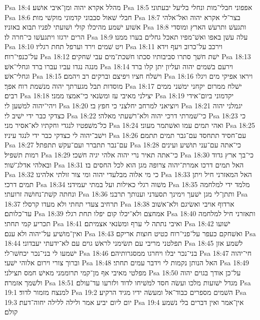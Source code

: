 Psa 18:4  מהלל אקרא יהוה ומן־איבי אושׁע׃
Psa 18:5  אפפוני חבלי־מות ונחלי בליעל יבעתוני׃
Psa 18:6  חבלי שׁאול סבבוני קדמוני מוקשׁי מות׃
Psa 18:7  בצר־לי אקרא יהוה ואל־אלהי אשׁוע ישׁמע מהיכלו קולי ושׁועתי לפניו תבוא באזניו׃
Psa 18:8  ותגעשׁ ותרעשׁ הארץ ומוסדי הרים ירגזו ויתגעשׁו כי־חרה לו׃
Psa 18:9  עלה עשׁן באפו ואשׁ־מפיו תאכל גחלים בערו ממנו׃
Psa 18:10  ויט שׁמים וירד וערפל תחת רגליו׃
Psa 18:11  וירכב על־כרוב ויעף וידא על־כנפי־רוח׃
Psa 18:12  ישׁת חשׁך סתרו סביבותיו סכתו חשׁכת־מים עבי שׁחקים׃
Psa 18:13  מנגה נגדו עביו עברו ברד וגחלי־אשׁ׃
Psa 18:14  וירעם בשׁמים יהוה ועליון יתן קלו ברד וגחלי־אשׁ׃
Psa 18:15  וישׁלח חציו ויפיצם וברקים רב ויהמם׃
Psa 18:16  ויראו אפיקי מים ויגלו מוסדות תבל מגערתך יהוה מנשׁמת רוח אפך׃
Psa 18:17  ישׁלח ממרום יקחני ימשׁני ממים רבים׃
Psa 18:18  יצילני מאיבי עז ומשׂנאי כי־אמצו ממני׃
Psa 18:19  יקדמוני ביום־אידי ויהי־יהוה למשׁען לי׃
Psa 18:20  ויוציאני למרחב יחלצני כי חפץ בי׃
Psa 18:21  יגמלני יהוה כצדקי כבר ידי ישׁיב לי׃
Psa 18:22  כי־שׁמרתי דרכי יהוה ולא־רשׁעתי מאלהי׃
Psa 18:23  כי כל־משׁפטיו לנגדי וחקתיו לא־אסיר מני׃
Psa 18:24  ואהי תמים עמו ואשׁתמר מעוני׃
Psa 18:25  וישׁב־יהוה לי כצדקי כבר ידי לנגד עיניו׃
Psa 18:26  עם־חסיד תתחסד עם־גבר תמים תתמם׃
Psa 18:27  עם־נבר תתברר ועם־עקשׁ תתפתל׃
Psa 18:28  כי־אתה עם־עני תושׁיע ועינים רמות תשׁפיל׃
Psa 18:29  כי־אתה תאיר נרי יהוה אלהי יגיה חשׁכי׃
Psa 18:30  כי־בך ארץ גדוד ובאלהי אדלג־שׁור׃
Psa 18:31  האל תמים דרכו אמרת־יהוה צרופה מגן הוא לכל החסים בו׃
Psa 18:32  כי מי אלוה מבלעדי יהוה ומי צור זולתי אלהינו׃
Psa 18:33  האל המאזרני חיל ויתן תמים דרכי׃
Psa 18:34  משׁוה רגלי כאילות ועל במתי יעמידני׃
Psa 18:35  מלמד ידי למלחמה ונחתה קשׁת־נחושׁה זרועתי׃
Psa 18:36  ותתן־לי מגן ישׁעך וימינך תסעדני וענותך תרבני׃
Psa 18:37  תרחיב צעדי תחתי ולא מעדו קרסלי׃
Psa 18:38  ארדוף אויבי ואשׂיגם ולא־אשׁוב עד־כלותם׃
Psa 18:39  אמחצם ולא־יכלו קום יפלו תחת רגלי׃
Psa 18:40  ותאזרני חיל למלחמה תכריע קמי תחתי׃
Psa 18:41  ואיבי נתתה לי ערף ומשׂנאי אצמיתם׃
Psa 18:42  ישׁועו ואין־מושׁיע על־יהוה ולא ענם׃
Psa 18:43  ואשׁחקם כעפר על־פני־רוח כטיט חוצות אריקם׃
Psa 18:44  תפלטני מריבי עם תשׂימני לראשׁ גוים עם לא־ידעתי יעבדוני׃
Psa 18:45  לשׁמע אזן ישׁמעו לי בני־נכר יכחשׁו־לי׃
Psa 18:46  בני־נכר יבלו ויחרגו ממסגרותיהם׃
Psa 18:47  חי־יהוה וברוך צורי וירום אלוהי ישׁעי׃
Psa 18:48  האל הנותן נקמות לי וידבר עמים תחתי׃
Psa 18:49  מפלטי מאיבי אף מן־קמי תרוממני מאישׁ חמס תצילני׃
Psa 18:50  על־כן אודך בגוים יהוה ולשׁמך אזמרה׃
Psa 18:51  מגדל ישׁועות מלכו ועשׂה חסד למשׁיחו לדוד ולזרעו עד־עולם׃
Psa 19:1  למנצח מזמור לדוד׃
Psa 19:2  השׁמים מספרים כבוד־אל ומעשׂה ידיו מגיד הרקיע׃
Psa 19:3  יום ליום יביע אמר ולילה ללילה יחוה־דעת׃
Psa 19:4  אין־אמר ואין דברים בלי נשׁמע קולם׃
